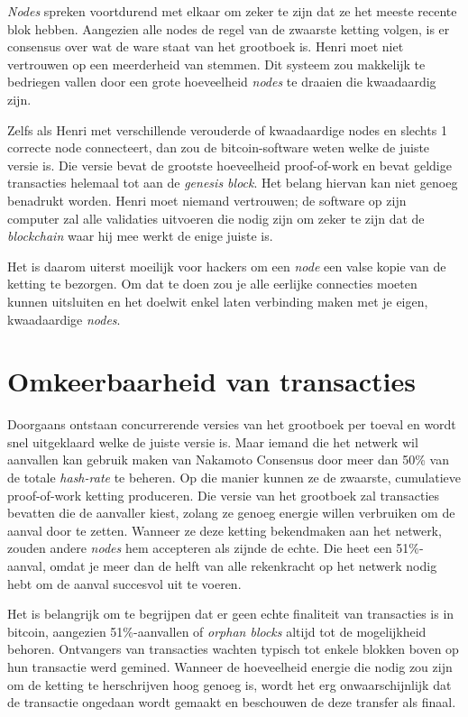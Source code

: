 \documentclass[
  letterpaper,
]{scrbook}
\begin{document}
\emph{Nodes} spreken voortdurend met elkaar om zeker te zijn dat ze het
meeste recente blok hebben. Aangezien alle nodes de regel van de
zwaarste ketting volgen, is er consensus over wat de ware staat van het
grootboek is. Henri moet niet vertrouwen op een meerderheid van stemmen.
Dit systeem zou makkelijk te bedriegen vallen door een grote hoeveelheid
\emph{nodes} te draaien die kwaadaardig zijn.

Zelfs als Henri met verschillende verouderde of kwaadaardige nodes en
slechts 1 correcte node connecteert, dan zou de bitcoin-software weten
welke de juiste versie is. Die versie bevat de grootste hoeveelheid
proof-of-work en bevat geldige transacties helemaal tot aan de
\emph{genesis block}. Het belang hiervan kan niet genoeg benadrukt
worden. Henri moet niemand vertrouwen; de software op zijn computer zal
alle validaties uitvoeren die nodig zijn om zeker te zijn dat de
\emph{blockchain} waar hij mee werkt de enige juiste is.

Het is daarom uiterst moeilijk voor hackers om een \emph{node} een valse
kopie van de ketting te bezorgen. Om dat te doen zou je alle eerlijke
connecties moeten kunnen uitsluiten en het doelwit enkel laten
verbinding maken met je eigen, kwaadaardige \emph{nodes}.

\hypertarget{omkeerbaarheid-van-transacties}{%
\section{Omkeerbaarheid van
transacties}\label{omkeerbaarheid-van-transacties}}

Doorgaans ontstaan concurrerende versies van het grootboek per toeval en
wordt snel uitgeklaard welke de juiste versie is. Maar iemand die het
netwerk wil aanvallen kan gebruik maken van Nakamoto Consensus door meer
dan 50\% van de totale \emph{hash-rate} te beheren. Op die manier kunnen
ze de zwaarste, cumulatieve proof-of-work ketting produceren. Die versie
van het grootboek zal transacties bevatten die de aanvaller kiest,
zolang ze genoeg energie willen verbruiken om de aanval door te zetten.
Wanneer ze deze ketting bekendmaken aan het netwerk, zouden andere
\emph{nodes} hem accepteren als zijnde de echte. Die heet een
51\%-aanval, omdat je meer dan de helft van alle rekenkracht op het
netwerk nodig hebt om de aanval succesvol uit te voeren.

Het is belangrijk om te begrijpen dat er geen echte finaliteit van
transacties is in bitcoin, aangezien 51\%-aanvallen of \emph{orphan
blocks} altijd tot de mogelijkheid behoren. Ontvangers van transacties
wachten typisch tot enkele blokken boven op hun transactie werd gemined.
Wanneer de hoeveelheid energie die nodig zou zijn om de ketting te
herschrijven hoog genoeg is, wordt het erg onwaarschijnlijk dat de
transactie ongedaan wordt gemaakt en beschouwen de deze transfer als
finaal.
\end{document}
